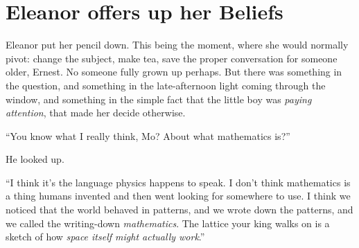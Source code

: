 %  
%  
%  
%  
%  
%  
\section*{Eleanor offers up her Beliefs}
 
Eleanor put her pencil down. This being the moment, where she would normally pivot: change the subject, make tea, save the proper conversation for someone older, Ernest. No someone fully grown up perhaps. But there was something in the question, and something in the late-afternoon light coming through the window, and
something in the simple fact that the little boy was \emph{paying
attention}, that made her decide otherwise.
 
``You know what I really think, Mo? About what mathematics is?''
 
He looked up.
 
``I think it's the language physics happens to speak. I don't think
mathematics is a thing humans invented and then went looking for
somewhere to use. I think we noticed that the world behaved in
patterns, and we wrote down the patterns, and we called the
writing-down \emph{mathematics}. The lattice your king walks on
is a sketch of how \emph{space itself might
actually work}.''
 
